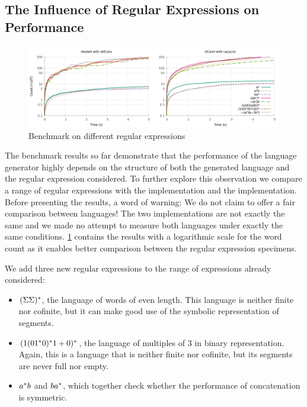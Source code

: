 \subsection{The Influence of Regular Expressions on Performance}
\begin{figure}[!tp]
  \centering
  \includegraphics[width=0.95\linewidth]{measure/langs.png}
  \caption{Benchmark on different regular expressions}
  \label{bench:langs}
\end{figure}

The benchmark results so far demonstrate that the performance of the language
generator highly depends on the structure of both
the generated language and the regular expression considered.
To further explore this observation we compare a range of regular expressions
with the  \haskell implementation and the 
\ocaml implementation.
Before presenting the results, a word of warning:
We do not claim to offer a fair comparison between languages!
The two implementations are not exactly the same and we made no attempt
to measure both languages under exactly the same conditions.
%
\cref{bench:langs} contains the results with a
logarithmic scale for the word count as it enables better comparison
between the regular expression specimens.

We add three new regular expressions to the range of expressions already considered:
\begin{itemize}
\item $(\Sigma\Sigma)^*$, the language of words of even
  length. This language is neither finite nor cofinite, but it can make
  good use of the symbolic representation of segments.
\item $(1 (01^*0)^*1 +{0})^*$, the language
  of multiples of 3 in binary representation. Again, this is a language that is neither
  finite nor cofinite, but its segments are never full nor empty.
\item $a^*b$ and $ba^*$, which together check whether
  the performance of {concatenation} is symmetric.
\end{itemize}

